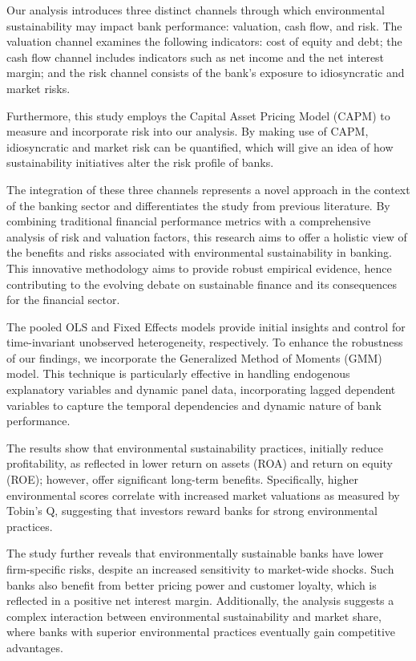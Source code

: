 \documentclass[11pt, a4paper]{article}
\begin{document}
Our analysis introduces three distinct channels through which environmental sustainability may impact bank performance: valuation, cash flow, and risk. The valuation channel examines the following indicators: cost of equity and debt; the cash flow channel includes indicators such as net income and the net interest margin; and the risk channel consists of the bank's exposure to idiosyncratic and market risks. 

Furthermore, this study employs the Capital Asset Pricing Model (CAPM) to measure and incorporate risk into our analysis. By making use of CAPM, idiosyncratic and market risk can be quantified, which will give an idea of how sustainability initiatives alter the risk profile of banks.

The integration of these three channels represents a novel approach in the context of the banking sector and differentiates the study from previous literature. By combining traditional financial performance metrics with a comprehensive analysis of risk and valuation factors, this research aims to offer a holistic view of the benefits and risks associated with environmental sustainability in banking. This innovative methodology aims to provide robust empirical evidence, hence contributing to the evolving debate on sustainable finance and its consequences for the financial sector.

The pooled OLS and Fixed Effects models provide initial insights and control for time-invariant unobserved heterogeneity, respectively. To enhance the robustness of our findings, we incorporate the Generalized Method of Moments (GMM) model. This technique is particularly effective in handling endogenous explanatory variables and dynamic panel data, incorporating lagged dependent variables to capture the temporal dependencies and dynamic nature of bank performance.

The results show that environmental sustainability practices, initially reduce profitability, as reflected in lower return on assets (ROA) and return on equity (ROE); however, offer significant long-term benefits. Specifically, higher environmental scores correlate with increased market valuations as measured by Tobin’s Q, suggesting that investors reward banks for strong environmental practices.

The study further reveals that environmentally sustainable banks have lower firm-specific risks, despite an increased sensitivity to market-wide shocks. Such banks also benefit from better pricing power and customer loyalty, which is reflected in a positive net interest margin. Additionally, the analysis suggests a complex interaction between environmental sustainability and market share, where banks with superior environmental practices eventually gain competitive advantages.
\end{document}
